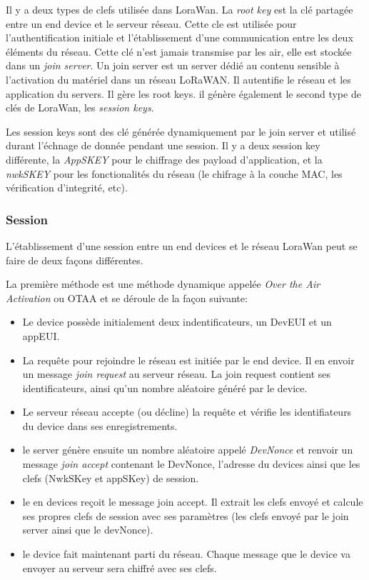Il y a deux types de clefs utilisée dans LoraWan. La \textit{root key} est la clé partagée entre un end device et le serveur réseau. Cette cle est utilisée pour l'authentification initiale et l'établissement d'une communication entre les deux éléments du réseau. Cette clé n'est jamais transmise par les air, elle est stockée dans un \textit{join server}. Un join server est un server dédié au contenu sensible à l'activation du matériel dans un réseau LoRaWAN. Il autentifie le réseau et les application du servers. Il gère les root keys. il génère également le second type de clés de LoraWan, les \textit{session keys}.

Les session keys sont des clé générée dynamiquement par le join server et utilisé durant l'échnage de donnée pendant une session. Il y a deux session key différente, la \textit{AppSKEY} pour le chiffrage des payload d'application, et la \textit{nwkSKEY} pour les fonctionalités du réseau (le chifrage à la couche MAC, les vérification d'integrité, etc).

\subsubsection{Session}

L'établissement d'une session entre un end devices et le réseau LoraWan peut se faire de deux façons différentes.

La première méthode est une méthode dynamique appelée \textit{Over the Air Activation} ou OTAA et se déroule de la façon suivante: 
\begin{itemize}
\item Le device possède initialement deux indentificateurs, un DevEUI et un appEUI.
\item La requête pour rejoindre le réseau est initiée par le end device. Il en envoir un message \textit{join request} au serveur réseau. La join request contient ses identificateurs, ainsi qu'un nombre aléatoire généré par le device.
\item Le serveur réseau accepte (ou décline) la requête et vérifie les identifiateurs du device dans ses enregistrements. 
\item le server génère ensuite un nombre aléatoire appelé \textit{DevNonce} et renvoir un message \textit{join accept} contenant le DevNonce, l'adresse du devices ainsi que les clefs (NwkSKey et appSKey) de session.
\item le en devices reçoit le message join accept. Il extrait les clefs envoyé et calcule ses propres clefs de session avec ses paramètres (les clefs envoyé par le join server ainsi que le devNonce).
\item le device fait maintenant parti du réseau. Chaque message que le device va envoyer au serveur sera chiffré avec ses clefs.
\end{itemize}
        
